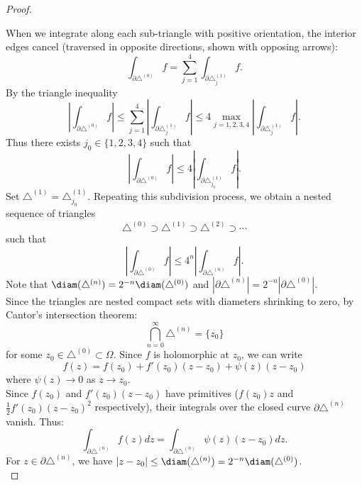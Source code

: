 \documentclass[a4paper]{article}
\begin{document}
\begin{proof}
\begin{center}
    \end{center}
    When we integrate along each sub-triangle with positive orientation, the interior edges cancel (traversed in opposite directions, shown with opposing arrows): \[
    \int_{\partial \triangle^{(0)}} f= \sum_{j=1}^4 \int_{\partial \triangle_j^{(1)}} f
    .\]     
    By the triangle inequality 
    \[
        \left | \int_{\partial \triangle^{(0)}}f \right |\leq \sum_{j=1}^4 \left | \int_{\partial \triangle_j^{(1)}}f \right | \leq 4 \max_{j=1,2,3,4} \left | \int_{\partial \triangle_j^{(1)}}f \right |
    .\] 
    Thus there exists $j_0\in\{1,2,3,4\}$ such that\[
     \left | \int_{\partial \triangle^{(0)}}f \right |\leq 4\left | \int_{\partial \triangle_{j_0}^{(1)}}f \right |
    .\]
    Set $\triangle^{(1)}=\triangle_{j_0}^{(1)}$. Repeating this subdivision process, we obtain a nested sequence of triangles 
    \[
    \triangle^{(0)}\supset \triangle^{(1)}\supset \triangle^{(2)}\supset \cdots
    \]
    such that 
    \[
        \left | \int_{\partial \triangle^{(0)}}f \right |\leq 4^n \left | \int_{\partial \triangle^{(n)}}f \right |
    .\]
    Note that $\diam(\triangle^{(n)})=2^{-n}\diam(\triangle^{(0)})$ and $|\partial \triangle^{(n)}|=2^{-n}|\partial \triangle^{(0)}|$.\\
    Since the triangles are nested compact sets with diameters shrinking to zero, by Cantor's intersection theorem:
    \[
    \bigcap_{n=0}^\infty \triangle^{(n)}=\{z_0\}
    \]
    for some $z_0\in \triangle^{(0)}\subset \Omega$.
    Since $f$ is holomorphic at $z_0$, we can write \[
    f(z)=f(z_0)+f'(z_0)(z-z_0)+\psi(z)(z-z_0) 
    \] 
    where $\psi(z)\to 0$ as $z\to z_0$.\\
    Since $f(z_0)$ and $f'(z_0)(z-z_0)$ have primitives ($f(z_0)z$ and $\frac{1}{2}f'(z_0)(z-z_0)^2$ respectively), their integrals over the closed curve $\partial \triangle^{(n)}$ vanish. Thus:
    \[
    \int_{\partial \triangle^{(n)}}f(z)dz=\int_{\partial \triangle^{(n)}}\psi(z)(z-z_0)dz
    .\] 
    For $z\in \partial \triangle^{(n)}$, we have $|z-z_0|\leq \diam(\triangle^{(n)})=2^{-n}\diam(\triangle^{(0)})$. \\

\end{proof}
\end{document}
